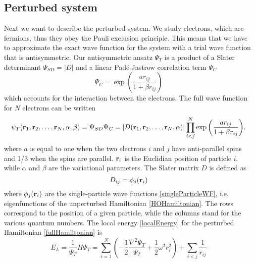 \documentclass[english, a4paper]{article}
\begin{document}
\subsection{Perturbed system}
Next we want to describe the perturbed system. 
We study electrons, which are fermions, thus they obey the Pauli exclusion principle.
This means that we have to approximate the exact wave function for the system with a trial
wave function that is antisymmetric. Our antisymmetric ansatz $\Psi_T$ is a product of a 
Slater determinant $\Psi_{SD} = |D|$ and a linear Padé-Jastrow correlation term $\Psi_C$ 
\begin{equation}
 \Psi_C = \exp{\left(\frac{a r_{ij}}{1+\beta r_{ij}}\right)}
 \label{correlationFunction}
\end{equation}
which accounts for the interaction between the electrons. 
The full wave function for $N$ electrons can be written
\begin{equation}
   \psi_{T}({\bf r}_1,{\bf r}_2,\dots, {\bf r}_N, \alpha, \beta) = \Psi_{SD}\Psi_C = 
   |D({\bf r}_1,{\bf r}_2,\dots, {\bf r}_N, \alpha)|
   \prod_{i<j}^{N}\exp{\left(\frac{a r_{ij}}{1+\beta r_{ij}}\right)}, 
   \label{trialWF}
\end{equation}
where $a$ is equal to one when the two electrons $i$ and $j$ have anti-parallel spins and 1/3 when the
spins are parallel. ${\bf r}_i$ is the Euclidian position of particle $i$, while
$\alpha$ and $\beta$ are the variational parameters.
The Slater matrix $D$ is defined as
\begin{equation}
 D_{ij} = \phi_j({\bf r}_i)
 \label{slaterMatrix}
\end{equation}
where $\phi_j({\bf r}_i)$ are the single-particle wave functions \eqref{singleParticleWF}, 
i.e. eigenfunctions of the unperturbed
Hamiltonian \eqref{HOHamiltonian}. The rows correspond to the position of a given particle, 
while the columns stand for the various quantum numbers.
The local energy \eqref{localEnergy}
for the perturbed Hamiltonian \eqref{fullHamiltonian} is
\begin{equation}
 E_L = \frac{1}{\Psi_T}H\Psi_T = \sum_{i=1}^N \left( -\frac{1}{2}\frac{\nabla^2\Psi_T}{\Psi_T} + 
 \frac{1}{2}\omega^2r_i^2 \right) + \sum_{i<j}\frac{1}{r_{ij}}
 \label{localEnergy2}
\end{equation}
\end{document}
